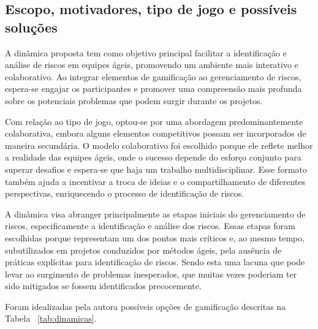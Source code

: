 \documentclass[
	12pt,
	openright,
	twoside,
	a4paper,
	english,
	brazil
	]{abntex2}
\begin{document}
\subsection{Escopo, motivadores, tipo de jogo e possíveis soluções}

A dinâmica proposta tem como objetivo principal facilitar a identificação e análise de riscos em equipes ágeis, promovendo um ambiente mais interativo e colaborativo. Ao integrar elementos de gamificação ao gerenciamento de riscos, espera-se engajar os participantes e promover uma compreensão mais profunda sobre os potenciais problemas que podem surgir durante os projetos.

Com relação ao tipo de jogo, optou-se por uma abordagem predominantemente colaborativa, embora alguns elementos competitivos possam ser incorporados de maneira secundária. O modelo colaborativo foi escolhido porque ele reflete melhor a realidade das equipes ágeis, onde o sucesso depende do esforço conjunto para superar desafios e espera-se que haja um trabalho multidisciplinar. Esse formato também ajuda a incentivar a troca de ideias e o compartilhamento de diferentes perspectivas, enriquecendo o processo de identificação de riscos.

A dinâmica visa abranger principalmente as etapas iniciais do gerenciamento de riscos, especificamente a identificação e análise dos riscos. Essas etapas foram escolhidas porque representam um dos pontos mais críticos e, ao mesmo tempo, subutilizados em projetos conduzidos por métodos ágeis, pela ausência de práticas explícitas para identificação de riscos. Sendo esta uma lacuna que pode levar ao surgimento de problemas inesperados, que muitas vezes poderiam ter sido mitigados se fossem identificados precocemente.

Foram idealizadas pela autora possíveis opções de gamificação descritas na Tabela ~\ref{tab:dinamicas}.
\end{document}
